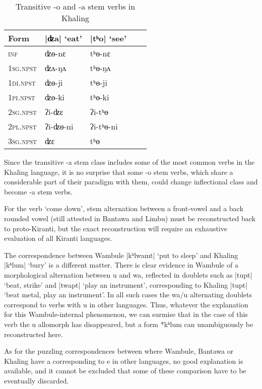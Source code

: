 \documentclass[oneside,a4paper,11pt]{article}
\newcommand{\ipa}[1]{{\phon\mbox{#1}}} %
\newcommand{\grise}[1]{\cellcolor{lightgray}\textbf{#1}}
\newcommand{\dhatu}[2]{|\ipa{#1}| `#2'}
\begin{document}
\begin{table}[H]
\caption{Transitive \ipa{-o} and \ipa{-a} stem verbs in Khaling} \centering \label{tab:a.o}
\begin{tabular}{lllll}
\toprule
Form &\dhatu{ʣa}{eat} & \dhatu{tʰo}{see} \\
\midrule
\textsc{inf} & \ipa{ʣɵ-nɛ} \grise{}& \ipa{tʰɵ-nɛ} \grise{}\\
\textsc{1sg.npst} & \ipa{ʣʌ-ŋʌ} & \ipa{tʰɵ-ŋʌ} \\
\textsc{1di.npst} & \ipa{ʣɵ-ji} \grise{}& \ipa{tʰɵ-ji} \grise{}\\
\textsc{1pi.npst} & \ipa{ʣɵ-ki} \grise{}& \ipa{tʰɵ-ki} \grise{}\\
\textsc{2sg.npst} & \ipa{ʔi-ʣɛ} & \ipa{ʔi-tʰɵ} \\
\textsc{2pl.npst} & \ipa{ʔi-ʣɵ-ni} \grise{}& \ipa{ʔi-tʰɵ-ni} \grise{}\\
\textsc{3sg.npst} & \ipa{ʣɛ} & \ipa{tʰɵ} \\
\bottomrule
\end{tabular}
\end{table}

Since the transitive  \ipa{-a} stem class includes some of the most common verbs in the Khaling language, it is no surprise that some \ipa{-o} stem verbs, which share a considerable part of their paradigm with them, could change inflectional class and become  \ipa{-a} stem verbs.

For the verb `come down', stem alternation between a front-vowel and a back rounded vowel (still attested in Bantawa and Limbu) must be reconstructed back to proto-Kiranti, but the exact reconstruction will require an exhaustive evaluation of all Kiranti languages.

The correspondence between Wambule \dhatu{kʰlwamt}{put to sleep} and Khaling \dhatu{kʰlum}{bury}  is a different matter. There is clear evidence in Wambule of a morphological alternation between \ipa{u} and \ipa{wa}, reflected in doublets such as \dhatu{tupt}{beat, strike} and \dhatu{twapt}{play an instrument}, corresponding to Khaling  \dhatu{tupt}{beat metal, play an instrument}. In all such cases the \ipa{wa}/\ipa{u} alternating doublets correspond to verbs with \ipa{u} in other languages. Thus, whatever the explanation for this Wambule-internal phenomenon, we can surmise that in the case of this verb the \ipa{u} allomorph has disappeared, but a form *\ipa{kʰlum} can unambiguously be reconstructed here.



As for the puzzling correspondences between where Wambule, Bantawa or Khaling have \ipa{a} corresponding to \ipa{e} in other languages, no good explanation is available, and it cannot be excluded that some of these comparison have to be eventually discarded.
\end{document}
